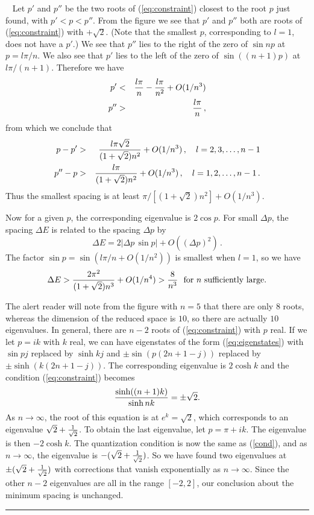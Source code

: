 \documentclass[aps,11pt,twoside,nofootinbib,tightenlines,superscriptaddress,preprintnumbers]{revtex4}
\newcommand{\<}{\langle}
\renewcommand{\>}{\rangle}
\newcommand{\be}{\begin{equation}}
\newcommand{\ee}{\end{equation}}
\newcommand{\bea}{\begin{eqnarray}}
\newcommand{\eea}{\end{eqnarray}}
\newcommand{\qed}{\rule{7pt}{7pt}}
\newenvironment{proof}
  {\trivlist\item\noindent{\bf Proof}~}
  {\qed\endtrivlist}
\begin{document}
\begin{proof}
Let $p'$ and $p''$ be the two roots of (\ref{eq:constraint}) closest to
the root $p$ just found, with $p' < p < p''$.  From the figure we see that
$p'$ and $p''$ both are roots of (\ref{eq:constraint}) with $+\sqrt2$.
(Note that the smallest $p$, corresponding to $l=1$, does not have a
$p'$.)   We see that $p''$ lies to the right of the zero of $\sin np$ at
$p=l\pi/n$.  We also see that $p'$ lies to the left of the zero of
$\sin((n+1)p)$ at $l \pi/(n+1)$.  Therefore we have
\bea
  p'  &<& {l \pi \over n} - {l \pi \over n^2} + O(1/n^3) \\
  p'' &>& {l \pi \over n}
\,,
\eea
from which we conclude that
\bea
  p-p'  &>& {l \pi \sqrt 2 \over (1+\sqrt2)n^2} + O(1/n^3) 
            \,, \quad l=2,3,\ldots,n-1 \\
  p''-p &>& {l \pi \over (1+\sqrt2)n^2} + O(1/n^3)
            \,, \quad l=1,2,\ldots,n-1
\,.
\eea
Thus the smallest spacing is at least $\pi/[(1+\sqrt2)n^2] + O(1/n^3)$.

Now for a given $p$, the corresponding eigenvalue is $2\cos p$.  For small
$\Delta p$, the spacing $\Delta E$ is related to the spacing $\Delta p$ by
\be
  \Delta E = 2 |\Delta p \, \sin p| + O\left((\Delta p)^2\right)
\,.
\ee
The factor $\sin p = \sin(l\pi/n + O (1/n^2))$ is smallest when $l=1$, so
we have
\be
  \Delta E > {2 \pi^2 \over (1+\sqrt 2) n^3} + O(1/n^4) > {8 \over n^3}
  \textrm{~ for $n$ sufficiently large.}
\ee

The alert reader will note from the figure with $n=5$ that there are only
$8$ roots, whereas the dimension of the reduced space is $10$, so there
are actually $10$ eigenvalues.  In general, there are $n-2$ roots of
(\ref{eq:constraint}) with $p$ real.  If we let $p=ik$ with $k$ real, we
can have eigenstates of the form (\ref{eq:eigenstates}) with $\sin pj$
replaced by $\sinh kj$ and $\pm \sin(p(2n+1-j))$ replaced by
$\pm\sinh(k(2n+1-j))$.  The corresponding eigenvalue is $2 \cosh k$ and
the condition (\ref{eq:constraint}) becomes
\be
  {\sinh((n+1)k) \over \sinh nk} = \pm \sqrt2 .
\label{cond}
\ee
As $n\to\infty$, the root of this equation is at $e^k=\sqrt{2}$, which
corresponds to an eigenvalue $\sqrt 2+{1 \over \sqrt 2}$. To obtain the
last eigenvalue, let $p=\pi + ik$.  The eigenvalue is then $-2\cosh k$.
The quantization condition is now the same as (\ref{cond}), and as
$n\to\infty$, the eigenvalue is $-(\sqrt 2+{1 \over \sqrt 2})$.  So we
have found two eigenvalues at $\pm(\sqrt 2+{1 \over \sqrt 2})$ with
corrections that vanish exponentially as $n\to\infty$.  Since the other
$n-2$ eigenvalues are all in the range $[-2,2]$, our conclusion about the
minimum spacing is unchanged.
\end{proof}
\end{document}

